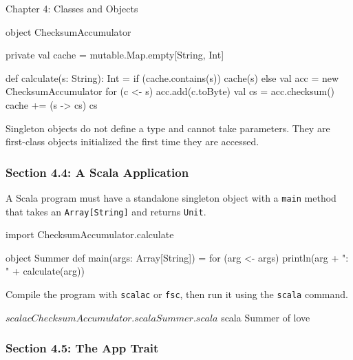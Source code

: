 \begin{notes}{Chapter 4: Classes and Objects}
\begin{highlight}
\begin{code}[Scala]
    object ChecksumAccumulator {
        private val cache = mutable.Map.empty[String, Int]

        def calculate(s: String): Int = {
            if (cache.contains(s))
                cache(s)
            else {
                val acc = new ChecksumAccumulator
                for (c <- s)
                    acc.add(c.toByte)
                val cs = acc.checksum()
                cache += (s -> cs)
                cs
            }
        }
    }
    \end{code}
    \end{highlight}

    Singleton objects do not define a type and cannot take parameters. They are first-class objects initialized the first time they are accessed.

    \subsubsection*{Section 4.4: A Scala Application}

    A Scala program must have a standalone singleton object with a \texttt{main} method that takes an \texttt{Array[String]} and returns \texttt{Unit}.

    \begin{highlight}
    \begin{code}[Scala]
    import ChecksumAccumulator.calculate

    object Summer {
        def main(args: Array[String]) = {
            for (arg <- args)
                println(arg + ": " + calculate(arg))
        }
    }
    \end{code}
    \end{highlight}

    Compile the program with \texttt{scalac} or \texttt{fsc}, then run it using the \texttt{scala} command.

    \begin{highlight}
    \begin{code}[Scala]
    $ scalac ChecksumAccumulator.scala Summer.scala
    $ scala Summer of love
    \end{code}
    \end{highlight}

    \subsubsection*{Section 4.5: The App Trait}


\end{notes}
